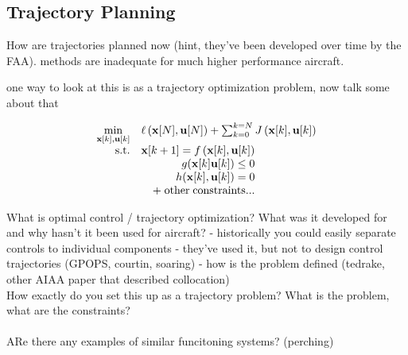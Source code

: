 \subsection{Trajectory Planning} \label{sec:trajectory-planning}
How are trajectories planned now (hint, they've been developed over time by the FAA). methods are inadequate for much higher performance aircraft. 

one way to look at this is as a trajectory optimization problem, now talk some about that


\begin{equation} \label{eq:traj-optimization-discrete-time}
	\begin{array}{rrclcl}
		\displaystyle \min_{\mathbf{x}[k],\mathbf{u}[k]} & \multicolumn{3}{l}{ \ell\left( \mathbf{x}[N],\mathbf{u}[N]\right) + \sum_{k=0}^{k=N} J\left( \mathbf{x}[k],\mathbf{u}[k]\right)}\\
		\textrm{s.t.} & \mathbf{x}[k+1] = f\left( \mathbf{x}[k], \mathbf{u}[k]\right)  \\
		& g(\mathbf{x}[k] \mathbf{u}[k])\leq 0  \\
		& h(\mathbf{x}[k],\mathbf{u}[k] ) = 0\\
		& + \; \mathrm{other \; constraints}...\\
	\end{array}
\end{equation}

What is optimal control / trajectory optimization? What was it developed for and why hasn't it been used for aircraft? 
- historically you could easily separate controls to individual components
- they've used it, but not to design control trajectories (GPOPS, courtin, soaring)
- how is the problem defined (tedrake, other AIAA paper that described collocation)
\\
How exactly do you set this up as a trajectory problem? What is the problem, what are the constraints?\\
\\
ARe there any examples of similar funcitoning systems? (perching) \\
\\